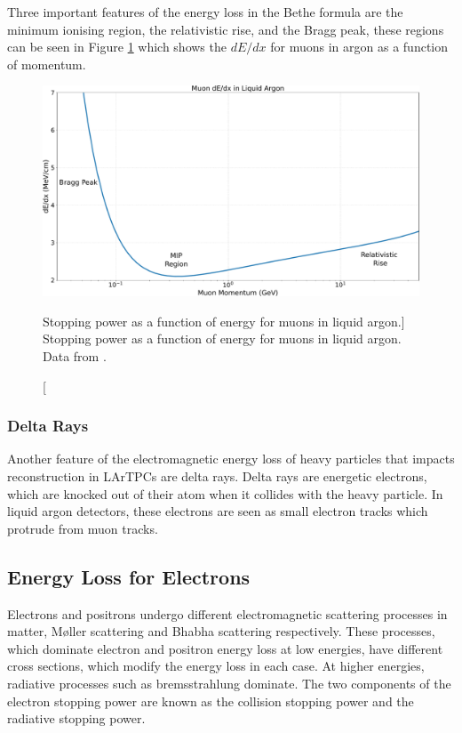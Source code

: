 Three important features of the energy loss in the Bethe formula are the minimum
ionising region, the relativistic rise, and the Bragg peak, these regions can be
seen in Figure \ref{fig:muon_dedx} which shows the $dE/dx$ for muons in argon 
as a function of momentum. 

\begin{figure}
	\centering
	\includegraphics[width=\textwidth]{figures/muon_dedx_argon.pdf}
	\caption
	[Stopping power as a function of energy for muons in liquid argon.]
	{ Stopping power as a function of energy for muons in liquid argon. Data from
	\cite{pdg_atomictables}.}
	\label{fig:muon_dedx}
\end{figure}

\subsubsection*{Delta Rays}
Another feature of the electromagnetic energy loss of heavy particles that
impacts reconstruction in LArTPCs are delta rays. Delta rays are energetic
electrons, which are knocked out of their atom when it collides with the heavy
particle. In liquid argon detectors, these electrons are seen as small electron 
tracks which protrude from muon tracks. 

\subsection{Energy Loss for Electrons}
Electrons and positrons undergo different electromagnetic scattering processes
in matter, M{\o}ller scattering and Bhabha scattering 
respectively\cite{10.2307/96528, 10.2307/96479}. These processes, which 
dominate electron and positron energy loss at low energies, have different 
cross sections, which modify the energy loss in each case. At higher energies, 
radiative processes such as bremsstrahlung dominate. The two components of the 
electron stopping power are known as the collision stopping power and the 
radiative stopping power.

